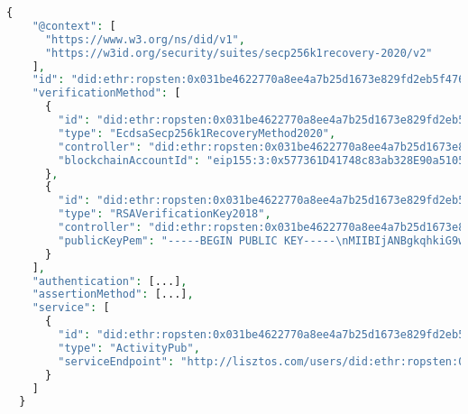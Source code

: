 \lstset{style=JSONStyle}
\begin{lstlisting}[language=PHP, caption=DID Document for Alicecreated with the \emph{did:ethr} DID method. It includes an RSA public key and a service that points to her profile URL in the Mastodon instance \emph{lisztos.com}, label=lst:alice_ethr_doc, float=ht]
  {
    "@context": [
      "https://www.w3.org/ns/did/v1",
      "https://w3id.org/security/suites/secp256k1recovery-2020/v2"
    ],
    "id": "did:ethr:ropsten:0x031be4622770a8ee4a7b25d1673e829fd2eb5f4762efcb18d09d468e6a00cc6c4d",
    "verificationMethod": [
      {
        "id": "did:ethr:ropsten:0x031be4622770a8ee4a7b25d1673e829fd2eb5f4762efcb18d09d468e6a00cc6c4d#controller",
        "type": "EcdsaSecp256k1RecoveryMethod2020",
        "controller": "did:ethr:ropsten:0x031be4622770a8ee4a7b25d1673e829fd2eb5f4762efcb18d09d468e6a00cc6c4d",
        "blockchainAccountId": "eip155:3:0x577361D41748c83ab328E90a51054712Fe49e211"
      },
      {
        "id": "did:ethr:ropsten:0x031be4622770a8ee4a7b25d1673e829fd2eb5f4762efcb18d09d468e6a00cc6c4d#delegate-1",
        "type": "RSAVerificationKey2018",
        "controller": "did:ethr:ropsten:0x031be4622770a8ee4a7b25d1673e829fd2eb5f4762efcb18d09d468e6a00cc6c4d",
        "publicKeyPem": "-----BEGIN PUBLIC KEY-----\nMIIBIjANBgkqhkiG9w0BAQEFA...npUZV+Q1FdWLiuFlKAwDt3DiD3\nNSz2b27Iga7wTSCoQ/DAhFAZ8KH8uCMrioIWFSKuYRgFOysbDfTT9Kpha8ST8K/H\nTQIDAQAB\n-----END PUBLIC KEY-----\n"
      }
    ],
    "authentication": [...],
    "assertionMethod": [...],
    "service": [
      {
        "id": "did:ethr:ropsten:0x031be4622770a8ee4a7b25d1673e829fd2eb5f4762efcb18d09d468e6a00cc6c4d#service-1",
        "type": "ActivityPub",
        "serviceEndpoint": "http://lisztos.com/users/did:ethr:ropsten:0x031be4622770a8ee4a7b25d1673e829fd2eb5f4762efcb18d09d468e6a00cc6c4d"
      }
    ]
  }
\end{lstlisting}